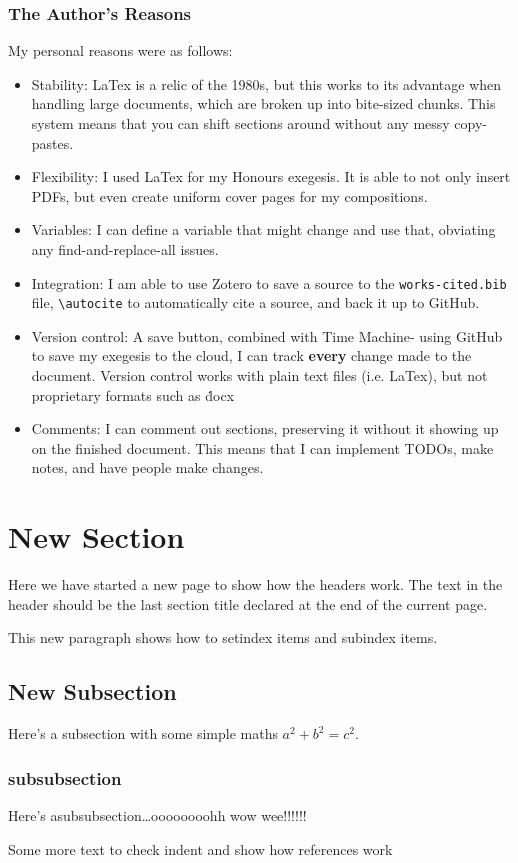 \subsubsection{The Author's Reasons}
My personal reasons were as follows:
\begin{itemize}
    \item Stability: LaTex is a relic of the 1980s, but this works to its advantage when handling large documents, which are broken up into bite-sized chunks. This system means that you can shift sections around without any messy copy-pastes.
    \item Flexibility: I used LaTex for my Honours exegesis. It is able to not only insert PDFs, but even create uniform cover pages for my compositions.
    \item Variables: I can define a variable that might change and use that, obviating any find-and-replace-all issues.
    \item Integration: I am able to use Zotero to save a source to the \lstinline{works-cited.bib} file, \lstinline{\autocite} to automatically cite a source, and back it up to GitHub.
    \item Version control: A save button, combined with Time Machine- using GitHub to save my exegesis to the cloud, I can track \textbf{every} change made to the document. Version control works with plain text files (i.e. LaTex), but not proprietary formats such as \.docx
    \item Comments: I can comment out sections, preserving it without it showing up on the finished document. This means that I can implement TODOs, make notes, and have people make changes.
\end{itemize}


\newpage
\section{New Section}
Here we have started a new page to show how the headers work. The
text in the header should be the last section title declared at
the end of the current page.

This new paragraph shows how to setindex items
and subindex items.

\subsection{New Subsection}
Here's a subsection with some simple maths \(a^2+b^2=c^2\).

\subsubsection{subsubsection}
Here's asubsubsection\ldots oooooooohh wow
wee!!!!!!

\newpage
Some more text to check indent and show how references work

